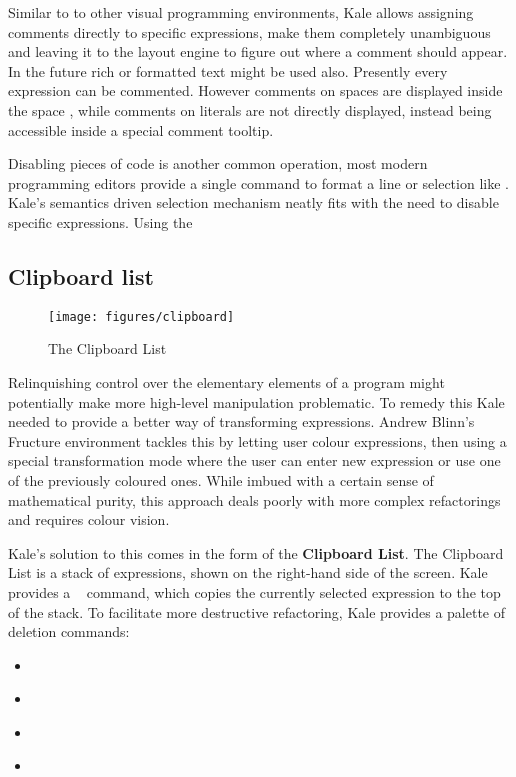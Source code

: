 Similar to to other visual
programming environments, Kale allows assigning comments directly to specific
expressions, make them completely unambiguous and leaving it to the layout
engine to figure out where a comment should appear. In the future rich or
formatted text might be used also. Presently every expression can be commented.
However comments on spaces are displayed inside the space , while
comments on literals are not directly displayed, instead being accessible
inside a special comment tooltip.

Disabling pieces of code is another common operation, most modern programming
editors provide a single command to format a line or selection like
\keys{\ctrl + /}. Kale's semantics driven selection mechanism neatly fits with
the need to disable specific expressions. Using the
\hyperref[cmd:disable]{}~\keys{\textbackslash}

\subsection{Clipboard list}
\begin{wrapfigure}[13]{R}{0.pt}
	\texttt{[image: figures/clipboard]}
	\caption{The Clipboard List}
\end{wrapfigure}

Relinquishing control over the elementary elements of a program might
potentially make more high-level manipulation problematic. To remedy this
Kale needed to provide a better way of transforming expressions. Andrew Blinn's
Fructure \cite{Fructure} environment tackles this by letting user colour
expressions, then
using a special transformation mode where the user can enter new expression or
use one of the previously coloured ones. While imbued with a certain sense of
mathematical purity, this approach deals poorly with more complex refactorings
and requires colour vision.

Kale's solution to this comes in the form of the \textbf{Clipboard List}. The
Clipboard List is a stack of expressions, shown on the right-hand side of the
screen. Kale provides a \hyperref[cmd:copy]{}~ command, which
copies the currently
selected expression to the top of the stack. To facilitate more destructive
refactoring, Kale provides a palette of deletion commands:

\begin{itemize}[noitemsep]
	\item \hyperref[cmd:delete]{} \keys{\backspace}
	\item \hyperref[cmd:cut]{} 
	\item \hyperref[cmd:delete_blank]{} 
	\item \hyperref[cmd:cut_blank]{} 
\end{itemize}

